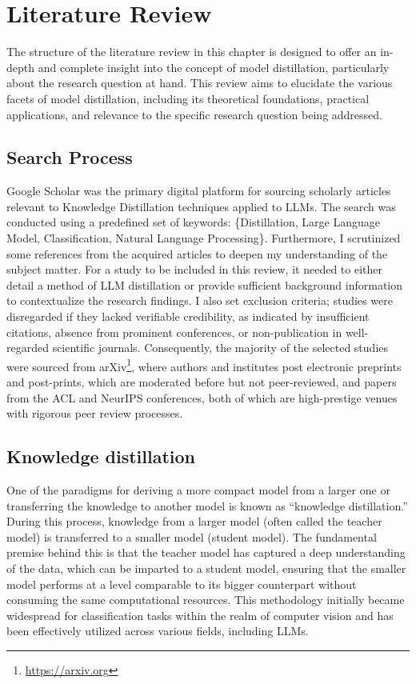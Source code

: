 \chapter{Literature Review}
\label{chap:lr}

The structure of the literature review in this chapter is designed to offer an in-depth and complete insight into the concept of model distillation, particularly about the research question at hand. This review aims to elucidate the various facets of model distillation, including its theoretical foundations, practical applications, and relevance to the specific research question being addressed.

\section{Search Process}

Google Scholar was the primary digital platform for sourcing scholarly articles relevant to Knowledge Distillation techniques applied to LLMs. The search was conducted using a predefined set of keywords: \{Distillation, Large Language Model, Classification, Natural Language Processing\}. Furthermore, I scrutinized some references from the acquired articles to deepen my understanding of the subject matter. For a study to be included in this review, it needed to either detail a method of LLM distillation or provide sufficient background information to contextualize the research findings. I also set exclusion criteria; studies were disregarded if they lacked verifiable credibility, as indicated by insufficient citations, absence from prominent conferences, or non-publication in well-regarded scientific journals. Consequently, the majority of the selected studies were sourced from arXiv\footnote{\url{https://arxiv.org}}, where authors and institutes post electronic preprints and post-prints, which are moderated before but not peer-reviewed, and papers from the ACL and NeurIPS conferences, both of which are high-prestige venues with rigorous peer review processes.

\section{Knowledge distillation}

One of the paradigms for deriving a more compact model from a larger one or transferring the knowledge to another model is known as ``knowledge distillation.'' During this process, knowledge from a larger model (often called the teacher model) is transferred to a smaller model (student model). The fundamental premise behind this is that the teacher model has captured a deep understanding of the data, which can be imparted to a student model, ensuring that the smaller model performs at a level comparable to its bigger counterpart without consuming the same computational resources. This methodology initially became widespread for classification tasks within the realm of computer vision and has been effectively utilized across various fields, including LLMs.


